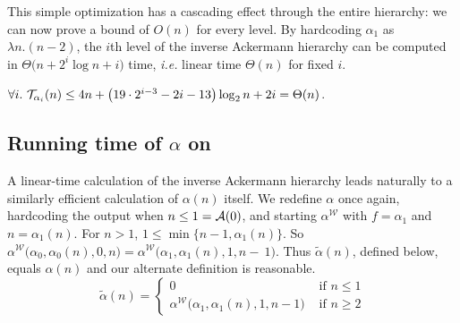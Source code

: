 This simple optimization has a cascading effect through the entire hierarchy:
we can now prove a bound of $O(n)$ for every level.
By hardcoding $\alpha_1$ as $\lambda n.(n-2)$, the $i$th level of the inverse Ackermann hierarchy can be computed in \linebreak $\Theta\big(n + 2^i\log n  + i\big)$ time, \emph{i.e.} linear time $\Theta(n)$ for fixed $i$.
\begin{thm} \label{thm: inv-ack-hier-runtime-improved}
	$\forall i.~\mathcal{T}_{\alpha_i}(n) \le 4n + \left(19\cdot 2^{i-3} - 2i - 13\right)\log_2n + 2i = \Theta(n)$.
\end{thm}

\subsection{Running time of $\alpha$ on } %

A linear-time calculation of the inverse Ackermann hierarchy 
leads naturally to a similarly efficient calculation of $\alpha(n)$ itself.
We redefine $\alpha$ once again, hardcoding the output 
when $n\le 1 = \mathcal{A}(0)$, and starting $\alpha^{\mathcal{W}}$ with 
$f = \alpha_1$ and $n = \alpha_1(n)$.
{\color{red}For $n > 1$, $1\le \min\big\{n-1, \alpha_1(n)\big\}$. So
$\alpha^{\mathcal{W}}\big(\alpha_0, \alpha_0(n), 0, n\big) =
\alpha^{\mathcal{W}}\big(\alpha_1, \alpha_1(n), 1, n-~1\big)$.
Thus $\tilde{\alpha}(n)$, defined below, equals $\alpha(n)$ and our alternate definition is reasonable.}
\begin{equation*}
\tilde{\alpha}(n) = \begin{cases}
0 & \text{ if } n \le 1 \\ \alpha^{\mathcal{W}}\big(\alpha_1, \alpha_1(n), 1, n-1\big) & \text{ if } n \ge 2
\end{cases}
\end{equation*}

